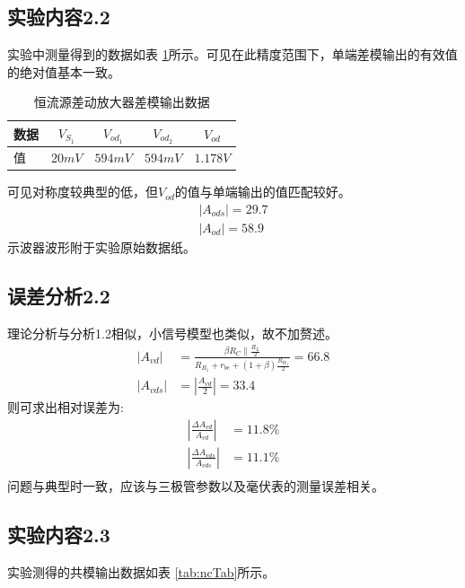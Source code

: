 \documentclass[a4paper,11pt,UTF8]{ctexart}
\begin{document}
	\subsection{实验内容2.2}
	实验中测量得到的数据如表 \ref{tab:sdTab}所示。可见在此精度范围下，单端差模输出的有效值的绝对值基本一致。
	\begin{table}[!h!tbp]
		\caption{恒流源差动放大器差模输出数据}\label{tab:sdTab}
		\centering
		\begin{tabular}{|l|c|c|c|c|}
			\hline
			数据 &$V_{S_1}$&$V_{od_1}$&$V_{od_2}$&$V_{od}$         \\ \hline
			值   &$20mV$&$594mV$&$594mV$&$1.178V$     \\ \hline
		\end{tabular}
	\end{table}
	可见对称度较典型的低，但$V_{od}$的值与单端输出的值匹配较好。
	\begin{equation}
		\begin{aligned}
			\left |A_{ods}\right |=29.7\\
			\left |A_{od}\right |=58.9
		\end{aligned}
	\end{equation}
	示波器波形附于实验原始数据纸。
	\subsection{误差分析2.2}
	理论分析与分析1.2相似，小信号模型也类似，故不加赘述。
	\begin{equation}
		\begin{aligned}
			\left | A_{vd}\right |&=\frac{\beta R_C\parallel\frac{R_L}{2}}{R_{B_1}+r_{be}+(1+\beta)\frac{R_{W_1}}{2}}=66.8\\
			\left | A_{vds}\right |&=\left |\frac{A_{vd}}{2}\right |=33.4
		\end{aligned}
	\end{equation}
	则可求出相对误差为:
	\begin{equation}
		\begin{aligned}
			\left |\frac{\Delta A_{vd}}{A_{vd}}\right |&=11.8\%\\
			\left |\frac{\Delta A_{vds}}{A_{vds}}\right |&=11.1\%\\
		\end{aligned}
	\end{equation}
	问题与典型时一致，应该与三极管参数以及毫伏表的测量误差相关。
	\subsection{实验内容2.3}
	实验测得的共模输出数据如表 \ref{tab:ncTab}所示。
	
\end{document}

